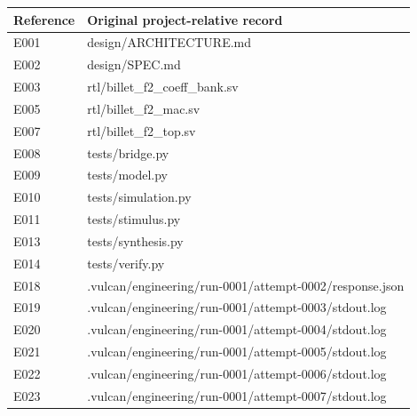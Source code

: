 \documentclass[11pt,a4paper]{article}
\begin{document}
{\small\renewcommand{\arraystretch}{1.18}\begin{longtable}{@{}L{0.12\textwidth}|L{0.82\textwidth}@{}}\toprule

\textbf{Reference} & \textbf{Original project-relative record}\\\midrule\endhead

E001 & design/\allowbreak{}ARCHITECTURE.md\\[2pt]\hline

E002 & design/\allowbreak{}SPEC.md\\[2pt]\hline

E003 & rtl/\allowbreak{}billet\_\allowbreak{}f2\_\allowbreak{}coeff\_\allowbreak{}bank.sv\\[2pt]\hline

E005 & rtl/\allowbreak{}billet\_\allowbreak{}f2\_\allowbreak{}mac.sv\\[2pt]\hline

E007 & rtl/\allowbreak{}billet\_\allowbreak{}f2\_\allowbreak{}top.sv\\[2pt]\hline

E008 & tests/\allowbreak{}bridge.py\\[2pt]\hline

E009 & tests/\allowbreak{}model.py\\[2pt]\hline

E010 & tests/\allowbreak{}simulation.py\\[2pt]\hline

E011 & tests/\allowbreak{}stimulus.py\\[2pt]\hline

E013 & tests/\allowbreak{}synthesis.py\\[2pt]\hline

E014 & tests/\allowbreak{}verify.py\\[2pt]\hline

E018 & .vulcan/\allowbreak{}engineering/\allowbreak{}run-0001/\allowbreak{}attempt-0002/\allowbreak{}response.json\\[2pt]\hline

E019 & .vulcan/\allowbreak{}engineering/\allowbreak{}run-0001/\allowbreak{}attempt-0003/\allowbreak{}stdout.log\\[2pt]\hline

E020 & .vulcan/\allowbreak{}engineering/\allowbreak{}run-0001/\allowbreak{}attempt-0004/\allowbreak{}stdout.log\\[2pt]\hline

E021 & .vulcan/\allowbreak{}engineering/\allowbreak{}run-0001/\allowbreak{}attempt-0005/\allowbreak{}stdout.log\\[2pt]\hline

E022 & .vulcan/\allowbreak{}engineering/\allowbreak{}run-0001/\allowbreak{}attempt-0006/\allowbreak{}stdout.log\\[2pt]\hline

E023 & .vulcan/\allowbreak{}engineering/\allowbreak{}run-0001/\allowbreak{}attempt-0007/\allowbreak{}stdout.log\\[2pt]\hline

\bottomrule\end{longtable}}
\end{document}
